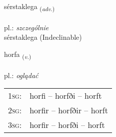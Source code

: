 \documentclass[frontgrid, backgrid]{flacards}\usepackage[]{graphicx}\usepackage[]{xcolor}
\begin{document}

\renewcommand{\flhead}{\vskip5pt \fboxsep=0pt {\small\bfseries\footnotesize Atviksorð | Adverb}}
\renewcommand{\fcfoot}{\vskip5pt \fboxsep=0pt \hspace{2pt}{\small\bfseries\footnotesize 1K}}

\renewcommand{\blhead}{\vskip5pt {\small\bfseries\footnotesize Atviksorð | Adverb }}
\renewcommand{\bcfoot}{\vskip5pt \hspace{2pt}{\small\bfseries\footnotesize 1K}}


{sérstaklega \small{\textsubscript{(\textit{adv.})}} \\[1ex]
 \\
pl.: \emph{szczególnie} \\  [2ex]
sérstaklega (Indeclinable)}

\renewcommand{\flhead}{\vskip5pt \fboxsep=0pt {\small\bfseries\footnotesize Sagnorð | Verb}}
\renewcommand{\fcfoot}{\vskip5pt \fboxsep=0pt \hspace{2pt}{\small\bfseries\footnotesize 1K}}

\renewcommand{\blhead}{\vskip5pt {\small\bfseries\footnotesize Sagnorð | Verb }}
\renewcommand{\bcfoot}{\vskip5pt \hspace{2pt}{\small\bfseries\footnotesize 1K}}


{horfa \small{\textsubscript{(\textit{v.})}} \\[1ex] %
\textphonetic{[hɔrva]} \\
pl.: \emph{oglądać} \\  [2ex]
\renewcommand*{\arraystretch}{0.8}
\begin{tabular}{p{1cm}l}
\textsc{1sg}: & horfi -- horfði -- horft \\ 
\textsc{2sg}: & horfir -- horfðir -- horft \\ 
\textsc{3sg}: & horfir -- horfði -- horft \\ 
\end{tabular}
}
\end{document}
